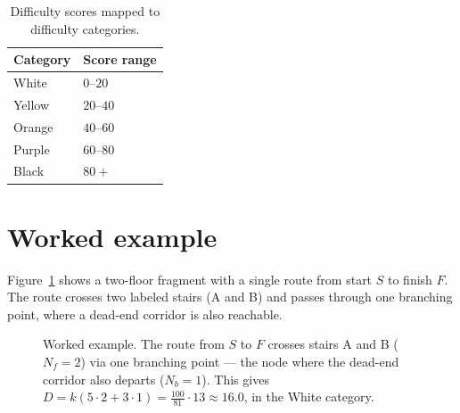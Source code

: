 \documentclass[11pt,a4paper,twocolumn]{article}
\begin{document}
\begin{table}[h]
\centering
\begin{tabular}{@{}ll@{}}
\toprule
\textbf{Category} & \textbf{Score range} \\ \midrule
White  & $0$--$20$  \\
Yellow & $20$--$40$ \\
Orange & $40$--$60$ \\
Purple & $60$--$80$ \\
Black  & $80+$      \\ \bottomrule
\end{tabular}
\caption{Difficulty scores mapped to difficulty categories.}
\label{tab:thresholds}
\end{table}

\section{Worked example}
\label{sec:example}

Figure~\ref{fig:example} shows a two-floor fragment with a single route from
start $S$ to finish $F$. The route crosses two labeled stairs (A and B) and
passes through one branching point, where a dead-end corridor is also
reachable.

\begin{figure}[h]
\centering
{}
\caption{Worked example. The route from $S$ to $F$ crosses stairs A and B
($N_f = 2$) via one branching point --- the node where the dead-end corridor
also departs ($N_b = 1$). This gives
$D = k(5 \cdot 2 + 3 \cdot 1) = \frac{100}{81}\cdot 13 \approx 16.0$, in the
White category.}
\label{fig:example}
\end{figure}
\end{document}
